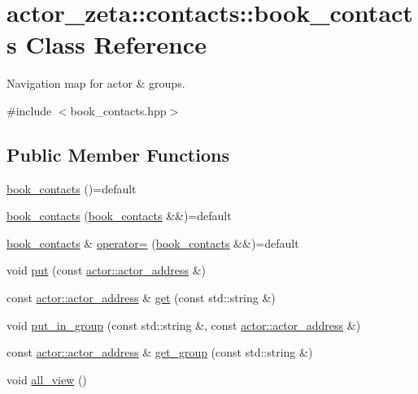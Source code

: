 \hypertarget{classactor__zeta_1_1contacts_1_1book__contacts}{}\section{actor\+\_\+zeta\+:\+:contacts\+:\+:book\+\_\+contacts Class Reference}
\label{classactor__zeta_1_1contacts_1_1book__contacts}


Navigation map for actor \& groups.  




{\ttfamily \#include $<$book\+\_\+contacts.\+hpp$>$}

\subsection*{Public Member Functions}
\begin{DoxyCompactItemize}
\item 
\hyperlink{classactor__zeta_1_1contacts_1_1book__contacts_a93162fcc68243ec556e677b3af0ffbb5}{book\+\_\+contacts} ()=default
\item 
\hyperlink{classactor__zeta_1_1contacts_1_1book__contacts_a738055d7898dfc774a991bd976a4cf4a}{book\+\_\+contacts} (\hyperlink{classactor__zeta_1_1contacts_1_1book__contacts}{book\+\_\+contacts} \&\&)=default
\item 
\hyperlink{classactor__zeta_1_1contacts_1_1book__contacts}{book\+\_\+contacts} \& \hyperlink{classactor__zeta_1_1contacts_1_1book__contacts_ab61cdef0f457ecdd0c8adde0b8d2e3fc}{operator=} (\hyperlink{classactor__zeta_1_1contacts_1_1book__contacts}{book\+\_\+contacts} \&\&)=default
\item 
void \hyperlink{classactor__zeta_1_1contacts_1_1book__contacts_a8ae49bfac18a50e9f7e4d1ac8abb1b48}{put} (const \hyperlink{classactor__zeta_1_1actor_1_1actor__address}{actor\+::actor\+\_\+address} \&)
\item 
const \hyperlink{classactor__zeta_1_1actor_1_1actor__address}{actor\+::actor\+\_\+address} \& \hyperlink{classactor__zeta_1_1contacts_1_1book__contacts_ae85462f8140edf9d5d9fb02fc74c76f6}{get} (const std\+::string \&)
\item 
void \hyperlink{classactor__zeta_1_1contacts_1_1book__contacts_a6f0ffb15b767f92dd0b0dd909542d42a}{put\+\_\+in\+\_\+group} (const std\+::string \&, const \hyperlink{classactor__zeta_1_1actor_1_1actor__address}{actor\+::actor\+\_\+address} \&)
\item 
const \hyperlink{classactor__zeta_1_1actor_1_1actor__address}{actor\+::actor\+\_\+address} \& \hyperlink{classactor__zeta_1_1contacts_1_1book__contacts_ab5d2dae8ce93346cb2bb8c3eb3b47371}{get\+\_\+group} (const std\+::string \&)
\item 
void \hyperlink{classactor__zeta_1_1contacts_1_1book__contacts_a7d674e3806ae3a1971e206312bc7983f}{all\+\_\+view} ()
\end{DoxyCompactItemize}


